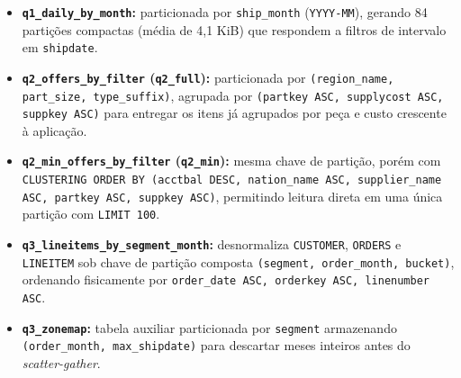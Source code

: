 \documentclass[12pt,a4paper]{article}
\begin{document}
\begin{itemize}
    \item \textbf{\texttt{q1\_daily\_by\_month}:} particionada por \texttt{ship\_month} (\texttt{YYYY-MM}), gerando 84 partições compactas (média de 4,1 KiB) que respondem a filtros de intervalo em \texttt{shipdate}.
    \item \textbf{\texttt{q2\_offers\_by\_filter} (\texttt{q2\_full}):} particionada por \texttt{(region\_name, part\_size, type\_suffix)}, agrupada por \texttt{(partkey ASC, supplycost ASC, suppkey ASC)} para entregar os itens já agrupados por peça e custo crescente à aplicação.
    \item \textbf{\texttt{q2\_min\_offers\_by\_filter} (\texttt{q2\_min}):} mesma chave de partição, porém com \texttt{CLUSTERING ORDER BY (acctbal DESC, nation\_name ASC, supplier\_name ASC, partkey ASC, suppkey ASC)}, permitindo leitura direta em uma única partição com \texttt{LIMIT 100}.
    \item \textbf{\texttt{q3\_lineitems\_by\_segment\_month}:} desnormaliza \texttt{CUSTOMER}, \texttt{ORDERS} e \texttt{LINEITEM} sob chave de partição composta \texttt{(segment, order\_month, bucket)}, ordenando fisicamente por \texttt{order\_date ASC, orderkey ASC, linenumber ASC}.
    \item \textbf{\texttt{q3\_zonemap}:} tabela auxiliar particionada por \texttt{segment} armazenando \texttt{(order\_month, max\_shipdate)} para descartar meses inteiros antes do \textit{scatter-gather}.
\end{itemize}
\end{document}
